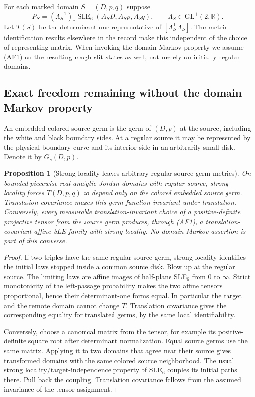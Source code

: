 \documentclass[11pt]{article}
\newtheorem{proposition}[theorem]{Proposition}
\theoremstyle{definition}\newtheorem{definition}[theorem]{Definition}
\theoremstyle{remark}\newtheorem{remark}[theorem]{Remark}
\begin{document}
For each marked domain $S=(D,p,q)$ suppose
\[
 P_S=(A_S^{-1})_*\operatorname{SLE}_6(A_SD,A_Sp,A_Sq),
 \qquad A_S\in\mathrm{GL}^+(2,\mathbb R).
 \tag{AF1}
\]
Let $T(S)$ be the determinant-one representative of
$[A_S^{\mathsf T}A_S]$. The metric-identification results elsewhere in the
record make this independent of the choice of representing matrix.
When invoking the domain Markov property we assume (AF1) on the resulting
rough slit states as well, not merely on initially regular domains.

\subsection{Exact freedom remaining without the domain Markov property}

An embedded colored source germ is the germ of $(D,p)$ at the source,
including the white and black boundary sides. At a regular source it may
be represented by the physical boundary curve and its interior side in
an arbitrarily small disk. Denote it by $G_s(D,p)$.

\begin{proposition}[Strong locality leaves arbitrary regular-source germ metrics]
\label{prop:sl-germfreedom}
On bounded piecewise real-analytic Jordan domains with regular source,
strong locality forces $T(D,p,q)$ to depend only on the colored embedded
source germ. Translation covariance makes this germ function invariant
under translation. Conversely, every measurable translation-invariant
choice of a positive-definite projective tensor from the source germ
produces, through (AF1), a translation-covariant affine-SLE family with
strong locality. No domain Markov assertion is part of this converse.
\end{proposition}
\begin{proof}
If two triples have the same regular source germ, strong locality identifies
the initial laws stopped inside a common source disk. Blow up at the regular
source. The limiting laws are affine images of half-plane SLE$_6$ from
$0$ to $\infty$. Strict monotonicity of the left-passage probability makes
the two affine tensors proportional, hence their determinant-one forms
equal. In particular the target and the remote domain cannot change $T$.
Translation covariance gives the corresponding equality for translated
germs, by the same local identifiability.

Conversely, choose a canonical matrix from the tensor, for example its
positive-definite square root after determinant normalization. Equal source
germs use the same matrix. Applying it to two domains that agree near their
source gives transformed domains with the same colored source neighborhood.
The usual strong locality/target-independence property of SLE$_6$ couples
its initial paths there. Pull back the coupling. Translation covariance
follows from the assumed invariance of the tensor assignment.
\end{proof}
\end{document}

